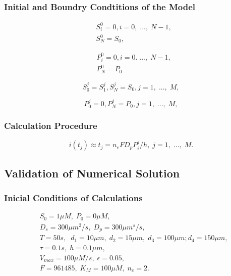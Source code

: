 \documentclass[12pt, a4paper, lithuanian]{article}
\begin{document}
\subsubsection{Initial and Boundry Condtitions of the Model}
\begin{equation}
\begin{aligned}
    &S_i^0 = 0, i = 0,\;...,\;N-1,\\
    &S_N^0 = S_0,
\end{aligned}
\end{equation}

\begin{equation}
\begin{aligned}
    &P_i^0 = 0, i = 0.\;...,\;N-1,\\
    &P_N^0 = P_0
\end{aligned}
\end{equation}

\begin{equation} 
    S_0^j = S_1^j, S_N^j = S_0, j=1,\; ...,\;M, 
\end{equation}

\begin{equation} 
    P_0^j = 0, P_N^j = P_0, j=1,\; ...,\;M, 
\end{equation}

\subsubsection{Calculation Procedure}

\begin{equation} 
    i(t_j) \approx t_j = n_eFD_pP_i^j/h,\; j=1,\;...,\;M. 
\end{equation}

\subsection{Validation of Numerical Solution}
\subsubsection{Inicial Conditions of Calculations}

\begin{equation}
\begin{aligned}
    &S_0 = 1 \mu M,\; P_0 = 0 \mu M,\\
    &D_s = 300 \mu m^2/s,\; D_p = 300 \mu m^s/s,\\
    &T = 50s,\;\; d_1 = 10 \mu m,\; d_2 = 15\mu m,\; d_3 = 100\mu m; d_4 =
    150\mu m,\\
    &\tau = 0.1s,\; h=0.1 \mu m,\\
    &V_{max} = 100\mu M /s,\; \epsilon = 0.05,\\
    &F=961485,\; K_M= 100\mu M,\; n_e = 2.
\end{aligned}
\end{equation}
\end{document}
